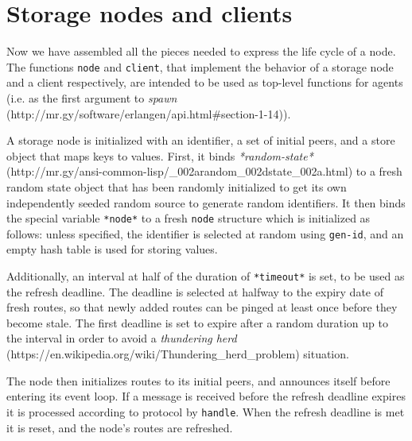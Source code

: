 \documentclass [a4paper,12pt,oneside]{article}\usepackage [paper=a4paper,left=37.5264mm,right=37.5264mm,top=37.5264mm,bottom=37.5264mm]{geometry}\usepackage {graphicx}\usepackage {tabularx}\usepackage {alltt}\usepackage {float}\usepackage [section]{placeins}\usepackage {titling}\setlength {\droptitle }{-4em}\pretitle {\begin {flushright}\bfseries \LARGE }\posttitle {\end {flushright}}\preauthor {\begin {flushright}}\postauthor {\end {flushright}}\predate {\begin {flushright}}\postdate {\end {flushright}}\usepackage [english]{babel}\usepackage [T1]{fontenc}\usepackage [utf8x]{inputenc}\usepackage {stmaryrd}\usepackage {amsfonts}\DeclareUnicodeCharacter {12314}{$\llbracket $}\DeclareUnicodeCharacter {12315}{$\rrbracket $}\DeclareUnicodeCharacter {9655}{$\rhd $}\newcommand \nobreakdash {\mbox {-}}\DeclareUnicodeCharacter {8209}{\nobreakdash }\usepackage [sc]{mathpazo}\linespread {1.05}\usepackage [font={small},labelformat=empty,labelsep=none]{caption}\tolerance=10000 \clubpenalty=10000 \widowpenalty=10000 \frenchspacing
\begin{document}
\section* {Storage nodes and clients}

Now we have assembled all the pieces needed to express the life cycle of a node. The functions \texttt {node} and \texttt {client}, that implement the behavior of a storage node and a client respectively, are intended to be used as top-level functions for agents (i.e. as the first argument to \textit {spawn} (\textsf {http:/\allowbreak /\allowbreak mr.gy/\allowbreak software/\allowbreak erlangen/\allowbreak api.html\#\allowbreak section-1-14})).

A storage node is initialized with an identifier, a set of initial peers, and a store object that maps keys to values. First, it binds \textit {*random-state*} (\textsf {http:/\allowbreak /\allowbreak mr.gy/\allowbreak ansi-common-lisp/\allowbreak \_002arandom\_002dstate\_002a.html}) to a fresh random state object that has been randomly initialized to get its own independently seeded random source to generate random identifiers. It then binds the special variable \texttt {*node*} to a fresh \texttt {node} structure which is initialized as follows: unless specified, the identifier is selected at random using \texttt {gen-id}, and an empty hash table is used for storing values.

Additionally, an interval at half of the duration of \texttt {*timeout*} is set, to be used as the refresh deadline. The deadline is selected at halfway to the expiry date of fresh routes, so that newly added routes can be pinged at least once before they become stale. The first deadline is set to expire after a random duration up to the interval in order to avoid a \textit {thundering herd} (\textsf {https:/\allowbreak /\allowbreak en.wikipedia.org/\allowbreak wiki/\allowbreak Thundering\_herd\_problem}) situation.

The node then initializes routes to its initial peers, and announces itself before entering its event loop. If a message is received before the refresh deadline expires it is processed according to protocol by \texttt {handle}. When the refresh deadline is met it is reset, and the node’s routes are refreshed.
\end{document}
